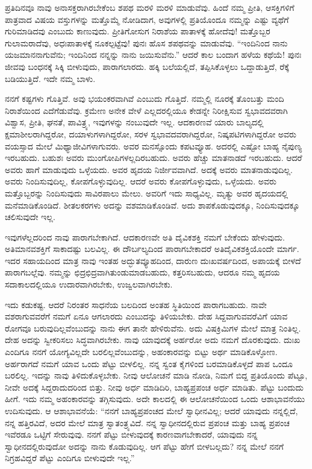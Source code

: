 ಪ್ರತಿದಿನವೂ ನಾವು ಅನಾಸಕ್ತರಾಗಿರಬೇಕೆಂಬ ಶಪಥ ಮರಳಿ ಮರಳಿ ಮಾಡುವೆವು. ಹಿಂದೆ ನಮ್ಮ ಪ್ರೀತಿ, ಆಸಕ್ತಿಗಳಿಗೆ ಪಾತ್ರವಾದ ವಿಷಯ ವಸ್ತುಗಳನ್ನು ಮತ್ತೊಮ್ಮೆ ನೋಡಿದಾಗ, ಅವುಗಳಲ್ಲಿ ಪ್ರತಿಯೊಂದೂ ನಮ್ಮನ್ನು ಎಷ್ಟು ವ್ಯಥೆಗೆ ಗುರಿಮಾಡಿದವು ಎಂಬುದು ಕಾಣುವುದು. ಪ್ರೀತಿಗೋಸುಗ ನಿರಾಶೆಯ ಪಾತಾಳಕ್ಕೆ ಹೋದೆವು! ಮತ್ತೊಬ್ಬರ ಗುಲಾಮರಾದೆವು, ಅಧಃಪಾತಾಳಕ್ಕೆ ನೂಕಲ್ಪಟ್ಟೆವು! ಪುನಃ ಹೊಸ ಶಪಥವನ್ನು ಮಾಡುವೆವು. “ಇಂದಿನಿಂದ ನಾನು ಯಜಮಾನನಾಗುವೆನು; ಇಂದಿನಿಂದ ನನ್ನನ್ನು ನಾನು ಜಯಿಸುವೆನು.'' ಆದರೆ ಕಾಲ ಬಂದಾಗ ಹಳೆಯ ಕಥೆಯೆ! ಪುನಃ ಜೀವವು ಬಂಧನಕ್ಕೆ ಸಿಕ್ಕಿ ಬೀಳುವುದು, ಪಾರಾಗಲಾರದು. ಹಕ್ಕಿ ಬಲೆಯಲ್ಲಿದೆ, ತಪ್ಪಿಸಿಕೊಳ್ಳಲು ಒದ್ದಾಡುತ್ತಿದೆ, ರೆಕ್ಕೆ ಬಡಿಯುತ್ತಿದೆ. ಇದೇ ನಮ್ಮ ಬಾಳು.

ನನಗೆ ಕಷ್ಟಗಳು ಗೊತ್ತಿವೆ. ಅವು ಭಯಂಕರವಾಗಿವೆ ಎಂಬುದು ಗೊತ್ತಿದೆ. ನಮ್ಮಲ್ಲಿ ನೂರಕ್ಕೆ ತೊಂಬತ್ತು ಮಂದಿ ನಿರಾಶೆಯಿಂದ ಎದೆಗೆಡುವೆವು. ಕ್ರಮೇಣ ಅನೇಕ ವೇಳೆ ಎಲ್ಲದರಲ್ಲಿಯೂ ಕೇಡನ್ನೇ ನಿರೀಕ್ಷಿಸುವ ಸ್ವಭಾವದವರಾಗಿ ವಿಶ್ವಾಸ, ಪ್ರೀತಿ, ಘನತೆ, ಪಾವಿತ್ರ್ಯ, ಇವುಗಳನ್ನು ನಂಬುವುದೇ ಇಲ್ಲ. ಆದಕಾರಣವೆ ಯಾರು ಬಾಲ್ಯದಲ್ಲಿ ಕ್ಷಮಾಶೀಲರಾಗಿದ್ದರೋ, ದಯಾಳುಗಳಾಗಿದ್ದರೋ, ಸರಳ ಸ್ವಭಾವದವರಾಗಿದ್ದರೋ, ನಿಷ್ಕಪಟಿಗಳಾಗಿದ್ದರೋ ಅವರು ವಯಸ್ಸಾದ ಮೇಲೆ ಮಿಥ್ಯಾಜೀವಿಗಳಾಗುವರು. ಅವರ ಮನಸ್ಸೊಂದು ಕಪಟವ್ಯೂಹ. ಅದರಲ್ಲಿ ಎಷ್ಟೋ ಬಾಹ್ಯ ನೈಪುಣ್ಯ ಇರಬಹುದು. ಬಹುಶಃ ಅವರು ಮುಂಗೋಪಿಗಳಲ್ಲದಿರಬಹುದು. ಅವರು ಹೆಚ್ಚು ಮಾತನಾಡದೆ ಇರಬಹುದು. ಆದರೆ ಅವರು ಹಾಗೆ ಮಾಡುವುದು ಒಳ್ಳೆಯದು. ಅವರ ಹೃದಯ ನಿರ್ಜೀವವಾಗಿದೆ. ಅದಕ್ಕೆ ಅವರು ಮಾತನಾಡುವುದಿಲ್ಲ. ಅವರು ನಿಂದಿಸುವುದಿಲ್ಲ, ಕೋಪಗೊಳ್ಳುವುದಿಲ್ಲ. ಆದರೆ ಅವರು ಕೋಪಗೊಳ್ಳುವುದು, ಒಳ್ಳೆಯದು. ಅವರು ಮತ್ತೊಬ್ಬರನ್ನು ನಿಂದಿಸುವುದು ಸಾವಿರಪಾಲು ಮೇಲು. ಅವರಿಗೆ ಇದು ಸಾಧ್ಯವಿಲ್ಲ. ಮೃತ್ಯು ಅವರ ಹೃದಯದಲ್ಲಿ ಮನೆಮಾಡಿಕೊಂಡಿದೆ. ಶೀತಲಕರಗಳು ಅದನ್ನು ವಶಮಾಡಿಕೊಂಡಿವೆ. ಅದು ಶಾಪಕೊಡುವುದಕ್ಕೂ, ನಿಂದಿಸುವುದಕ್ಕೂ ಚಲಿಸುವುದೇ ಇಲ್ಲ.

ಇವುಗಳೆಲ್ಲದರಿಂದ ನಾವು ಪಾರಾಗಬೇಕಾಗಿದೆ. ಆದಕಾರಣವೇ ಅತಿ ದೈವಿಕಶಕ್ತಿ ನಮಗೆ ಬೇಕೆಂದು ಹೇಳುವುದು. ಅತಿಮಾನವಶಕ್ತಿಗೆ ಸಾಕಾದಷ್ಟು ಬಲವಿಲ್ಲ. ಈ ದೌರ್ಬಲ್ಯದಿಂದ ಪಾರಾಗಬೇಕಾದರೆ ಅತಿದೈವಿಕಶಕ್ತಿಯೊಂದೇ ಮಾರ್ಗ. ಇದರ ಸಹಾಯದಿಂದ ಮಾತ್ರ ನಾವು ಇಂತಹ ಅದ್ಭುತವ್ಯೂಹದಿಂದ, ದಾರುಣ ದುಃಖವರ್ಷದಿಂದ, ಅಪಾಯಕ್ಕೆ ಬೀಳದೆ ಪಾರಾಗಬಲ್ಲೆವು. ನಮ್ಮನ್ನು ಛಿದ್ರಛಿದ್ರವಾಗಿ\break ತುಂಡುಮಾಡಬಹುದು, ಕತ್ತರಿಸಬಹುದು, ಆದರೂ ನಮ್ಮ ಹೃದಯ ಸದಾಕಾಲದಲ್ಲಿಯೂ ಉದಾರವಾಗಿರಬೇಕು, ಉಜ್ವಲವಾಗಿರಬೇಕು.

ಇದು ಕಡುಕಷ್ಟ. ಆದರೆ ನಿರಂತರ ಸಾಧನೆಯ ಬಲದಿಂದ ಅಂತಹ ಸ್ಥಿತಿಯಿಂದ ಪಾರಾಗಬಹುದು. ನಾವೇ ವಶರಾಗುವವರೆಗೆ ನಮಗೆ ಏನೂ ಆಗಲಾರದು ಎಂಬುದನ್ನು ತಿಳಿಯಬೇಕು. ದೇಹ ಸಿದ್ದವಾಗುವವರೆವಿಗೆ ಯಾವ ರೋಗವೂ ಬರುವುದಿಲ್ಲವೆಂಬುದನ್ನು ನಾನು ಈಗ ತಾನೇ ಹೇಳಿರುವೆನು. ಅದು ವಿಷಕ್ರಿಮಿಗಳ ಮೇಲೆ ಮಾತ್ರ ನಿಂತಿಲ್ಲ. ದೇಹ ಅದನ್ನು ಸ್ವೀಕರಿಸಲು ಸಿದ್ಧವಾಗಿರಬೇಕು. ನಾವು ಯಾವುದಕ್ಕೆ ಅರ್ಹರೋ ಅದು ನಮಗೆ ದೊರಕುವುದು. ದುಃಖ ಎಂದಿಗೂ ನನಗೆ ಯೋಗ್ಯವಿಲ್ಲದೇ ಬರಲಿಲ್ಲವೆಂಬುದನ್ನು, ಅಹಂಕಾರವನ್ನು ಬಿಟ್ಟು ಅರ್ಥ ಮಾಡಿಕೊಳ್ಳೋಣ. ಅರ್ಹರಾಗದೆ ನಮಗೆ ಯಾವ ಒಂದು ಪೆಟ್ಟು ಬೀಳಲಿಲ್ಲ. ನನ್ನ ಸ್ವಂತ ಕೈಗಳಿಂದ ಬರಮಾಡಿಕೊಳ್ಳದೆ ಪಾಪ ಒಂದೂ ಬರಲಿಲ್ಲ. ಇದನ್ನು ನಾವು ತಿಳಿದುಕೊಳ್ಳಬೇಕು. ನೀವು ಆಲೋಚನೆ ಮಾಡಿ ನೋಡಿ, ನಿಮಗೆ ಬಿದ್ದ ಪ್ರತಿಯೊಂದು ಪೆಟ್ಟೂ, ನೀವೇ ಅದಕ್ಕೆ ಸಿದ್ದರಾದುದರಿಂದ ಬಿತ್ತು. ನೀವು ಅರ್ಧ ಮಾಡಿದಿರಿ, ಬಾಹ್ಯಪ್ರಪಂಚ ಅರ್ಧ ಮಾಡಿತು. ಪೆಟ್ಟು ಬಂದುದು ಹೀಗೆ. ಇದು ನಮ್ಮ ಅಹಂಕಾರವನ್ನು ತಗ್ಗಿಸುವುದು. ಅದೇ ಕಾಲದಲ್ಲಿ ಈ ಆಲೋಚನೆಯಿಂದ ಒಂದು ಆಶಾಭಾವನೆಯು ಉದಿಸುವುದು. ಆ ಆಶಾಭಾವನೆಯೆ: “ನನಗೆ ಬಾಹ್ಯಪ್ರಪಂಚದ ಮೇಲೆ ಸ್ವಾಧೀನವಿಲ್ಲ; ಆದರೆ ಯಾವುದು ನನ್ನಲ್ಲಿದೆ, ನನ್ನ ಹತ್ತಿರವಿದೆ, ಅದರ ಮೇಲೆ ಮಾತ್ರ ಸ್ವಾತಂತ್ರ್ಯವಿದೆ. ನನ್ನ ಸ್ವಾಧೀನದಲ್ಲಿರುವ ಪ್ರಪಂಚ ಮತ್ತು ಬಾಹ್ಯ ಪ್ರಪಂಚ ಇವೆರಡೂ ಒಟ್ಟಿಗೆ ಸೇರುವುವು. ನನಗೆ ಪೆಟ್ಟು ಬೀಳುವುದಕ್ಕೆ ಕಾರಣವಾಗಬೇಕಾದರೆ, ಯಾವುದು ನನ್ನ ಸ್ವಾಧೀನದಲ್ಲಿರುವುದೋ ಅದನ್ನು ನಾನು ಕೊಡುವುದಿಲ್ಲ. ಆಗ ಪೆಟ್ಟು ಹೇಗೆ ಬೀಳಬಲ್ಲದು? ನನ್ನ ಮೇಲೆ ನನಗೆ ನಿಗ್ರಹವಿದ್ದರೆ ಪೆಟ್ಟು ಎಂದಿಗೂ ಬೀಳುವುದೇ ಇಲ್ಲ.”

